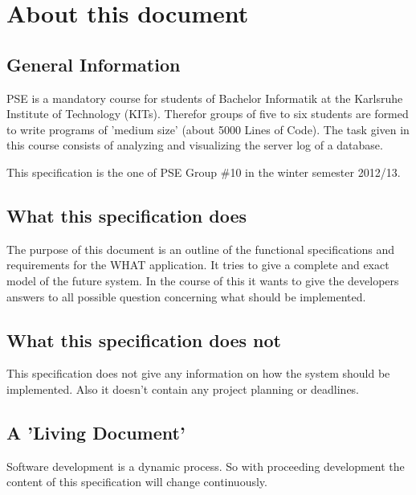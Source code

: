 \section*{About this document}


\subsection*{General Information}
PSE is a mandatory course for students of Bachelor Informatik at the %
Karlsruhe Institute of Technology (\glspl{KIT}). Therefor groups of five to six
students are formed to write programs of 'medium size' (about 5000 Lines of Code). 
The task given in this course consists of analyzing and visualizing the server log of a database.

This specification is the one of PSE Group \#10 in the winter semester 2012/13.


\subsection*{What this specification does}
The purpose of this document is an outline of the functional specifications and requirements
for the WHAT application. It tries to give a complete and exact model of the future system.
In the course of this it wants to give the developers answers to all possible question concerning
what should be implemented.


\subsection*{What this specification does not}
This specification does not give any information on how the system should be implemented. 
Also it doesn't contain any project planning or deadlines.


\subsection*{A 'Living Document'}
Software development is a dynamic process. So with proceeding development the
content of this specification will change continuously. 



